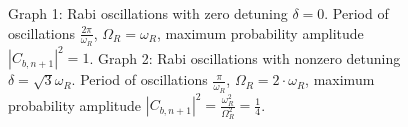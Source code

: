 \begin{figure}
\centering



\caption{Graph 1: Rabi oscillations with zero detuning $\delta = 0$. Period of
  oscillations $\frac{2 \pi}{\omega_R}$, $\Omega_R = \omega_R$,
  maximum probability amplitude $\left|C_{b,n+1}\right|^2 = 1$.
  Graph 2: Rabi oscillations with nonzero detuning $\delta =
  \sqrt{3}\omega_R$. 
  Period of oscillations $\frac{\pi}{\omega_R}$, $\Omega_R = 2 \cdot \omega_R$,
  maximum probability amplitude $\left|C_{b,n+1}\right|^2 =
  \frac{\omega_R^2}{\Omega_R^2} = \frac{1}{4}$.} 
\label{figPart1InteractionRabiDelta}
\end{figure}